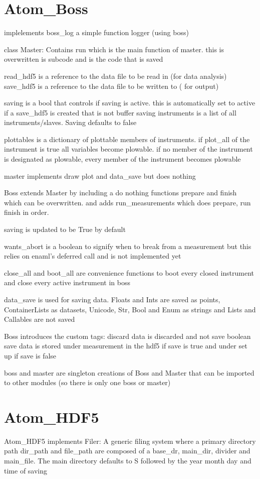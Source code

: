 \documentclass[12pt,a4paper]{article}
\begin{document}
\section{{Atom\_Boss}}

implelements {boss\_log} a simple function logger (using boss)

class Master:
Contains run which is the main function of master. this is overwritten is subcode and is the code that is saved

{read\_hdf5} is a reference to the data file to be read in (for data analysis)
{save\_hdf5} is a reference to the data file to be written to ( for output)

saving is a bool that controls if saving is active. this is automatically set to active if a {save\_hdf5} is created that is not buffer saving
instruments is a list of all instruments/slaves. Saving defaults to false

plottables is a dictionary of plottable members of instruments. if {plot\_all} of the instrument is true all variables become plowable. if no member of the instrument is designated as plowable, every member of the instrument becomes plowable

master implements draw plot and {data\_save} but does nothing

Boss extends Master by including a do nothing functions prepare and finish which can be overwritten. and adds run\_measurements which does prepare, run finish in order.

saving is updated to be True by default

{wants\_abort} is a boolean to signify when to break from a measurement but this relies on enaml's deferred call and is not implemented yet

{close\_all} and {boot\_all} are convenience functions to boot every closed instrument and close every active instrument in boss

{data\_save} is used for saving data. Floats and Ints are saved as points, ContainerLists as datasets, Unicode, Str, Bool and Enum as strings and Lists and Callables are not saved

Boss introduces the custom tags:
discard data is discarded and not save boolean
save data is stored under measurement in the hdf5 if save is true and under set up if save is false

boss and master are singleton creations of Boss and Master that can be imported to other modules (so there is only one boss or master)

\section{{Atom\_HDF5} }
{Atom\_HDF5} implements
Filer:
A generic filing system where a primary directory path dir\_path and file\_path are composed of a base\_dr, main\_dir, divider and main\_file. The main directory defaults to S followed by the year month day and time of saving
\end{document}
